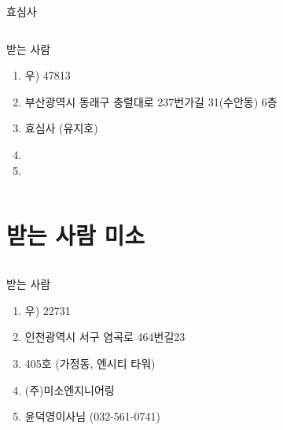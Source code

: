 \documentclass[aspectratio=1610,12pt,xcolor=pdftex,dvipsnames,table,handout]{beamer}
\begin{document}
		\begin{frame}[t,plain]{ 효심사 }

		\begin{columns}[t]
		\begin{column}{1.0\textwidth}

			\begin{block} {받는 사람}
			\begin{enumerate}
			\item [] 우) 47813
			\item [] 부산광역시 동래구 충렬대로 237번가길 31(수안동) 6층
			\item [] 효심사 (유지호)
			\item [] 
			\item [] 
			\end{enumerate}
			\end{block}

		\end{column}

		\begin{column}{.2\textwidth}
		\end{column}
		\end{columns}

		\end{frame}



		\section{받는 사람 미소}
	
		\begin{frame}[c,plain]{}

		\begin{columns}[t]
		\begin{column}{1.0\textwidth}

			\begin{block} {받는 사람}
			\begin{enumerate}
			\item [] 우) 22731
			\item [] 인천광역시 서구 염곡로 464번길23
			\item [] 405호 (가정동, 엔시티 타워)
			\item [] (주)미소엔지니어링 
			\item [] 윤덕영이사님 (032-561-0741)
			\end{enumerate}
			\end{block}

		\end{column}

		\begin{column}{.2\textwidth}
		\end{column}
		\end{columns}

		\end{frame}
\end{document}
